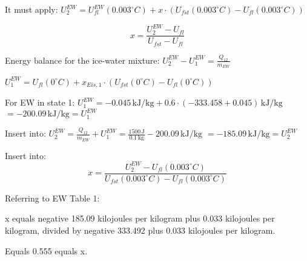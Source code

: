 It must apply:  
\( U_2^{EW} = U_{fl}^{EW}(0.003^\circ C) + x \cdot (U_{fst}(0.003^\circ C) - U_{fl}(0.003^\circ C)) \)  

\[ x = \frac{U_2^{EW} - U_{fl}}{U_{fst} - U_{fl}} \]  

Energy balance for the ice-water mixture:  
\( U_2^{EW} - U_1^{EW} = \frac{Q_{12}}{m_{EW}} \)  

\( U_1^{EW} = U_{fl}(0^\circ C) + x_{Eis,1} \cdot (U_{fst}(0^\circ C) - U_{fl}(0^\circ C)) \)  

For EW in state 1:  
\( U_1^{EW} = -0.045 \, \text{kJ/kg} + 0.6 \cdot (-333.458 + 0.045) \, \text{kJ/kg} \)  
\( = -200.09 \, \text{kJ/kg} = U_1^{EW} \)  

Insert into:  
\( U_2^{EW} = \frac{Q_{12}}{m_{EW}} + U_1^{EW} = \frac{1500 \, \text{J}}{0.1 \, \text{kg}} - 200.09 \, \text{kJ/kg} \)  
\( = -185.09 \, \text{kJ/kg} = U_2^{EW} \)  

Insert into:  
\[ x = \frac{U_2^{EW} - U_{fl}(0.003^\circ C)}{U_{fst}(0.003^\circ C) - U_{fl}(0.003^\circ C)} \]

Referring to EW Table 1:  

x equals negative 185.09 kilojoules per kilogram plus 0.033 kilojoules per kilogram, divided by negative 333.492 plus 0.033 kilojoules per kilogram.  

Equals 0.555 equals x.